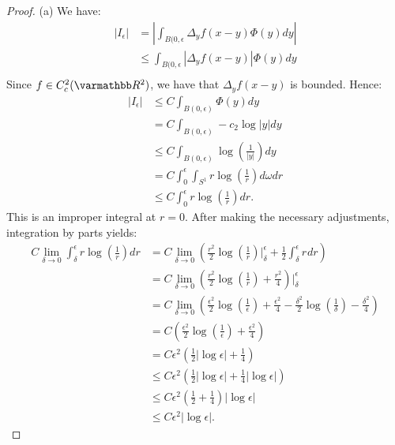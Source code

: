 \documentclass[10pt,oneside,openany]{memoir}
\begin{document}
	\begin{proof}
		(a) We have:
		\begin{align*}
			|I_\epsilon|
			&= \left| \int_{B(0,\epsilon}^{} \Delta_yf(x-y) \Phi(y)dy \right|  \\
			&\leq \int_{B(0,\epsilon}^{} \left| \Delta_y f(x-y) \right| \Phi(y)dy   \\
		\end{align*}
		Since $f \in C^2_c(\bfR^2)$, we have that $\Delta_y f(x-y)$ is bounded. Hence:
		\begin{align*}
			|I_\epsilon|
			& \leq C \int_{B(0,\epsilon)}^{} \Phi(y)dy \\
			& = C \int_{B(0,\epsilon)}^{} -c_2 \log |y| dy \\
			& \leq C \int_{B(0,\epsilon)}^{} \log\left( \frac{1}{|y|} \right) dy \\ 
			&= C \int_{0}^{\epsilon} \int_{S^1}^{} r \log \left( \frac{1}{r} \right) d\omega dr \\
			&\leq C \int_{0}^{\epsilon} r \log \left( \frac{1}{r} \right) dr.
		\end{align*}
		This is an improper integral at $r = 0$. After making the necessary adjustments, integration by parts yields:
		\begin{align*}
			C \lim_{\delta \rightarrow 0} \int_{\delta}^{\epsilon}r \log \left( \frac{1}{r} \right) dr 
			& = C \lim_{\delta \rightarrow 0} \left( \frac{r^2}{2}\log \left( \frac{1}{r} \right) \Bigg|_\delta^\epsilon + \frac{1}{2}\int_{\delta}^{\epsilon} r^{}dr\right)  \\
			&= C\lim_{\delta \rightarrow 0} \left( \frac{r^2}{2}\log \left( \frac{1}{r} \right) + \frac{r^2}{4} \right)\Bigg|_\delta^\epsilon  \\
			&=C \lim_{\delta \rightarrow 0} \left( \frac{\epsilon^2}{2}\log\left( \frac{1}{\epsilon} \right) + \frac{\epsilon^2}{4} - \frac{\delta^2}{2}\log\left( \frac{1}{\delta} \right) - \frac{\delta^2}{4}\right) \\ 
			&= C \left(  \frac{\epsilon^2}{2}\log\left( \frac{1}{\epsilon} \right) + \frac{\epsilon^2}{4}\right) \\
			&= C \epsilon^2 \left( \frac{1}{2}|\log\epsilon| + \frac{1}{4} \right) \\
			&\leq C \epsilon^2 \left( \frac{1}{2}|\log\epsilon| + \frac{1}{4}|\log\epsilon| \right)\\
			& \leq C \epsilon^2 \left( \frac{1}{2} + \frac{1}{4} \right)|\log\epsilon| \\
			& \leq C \epsilon^2 |\log\epsilon|.
		\end{align*}


\end{proof}
\end{document}
